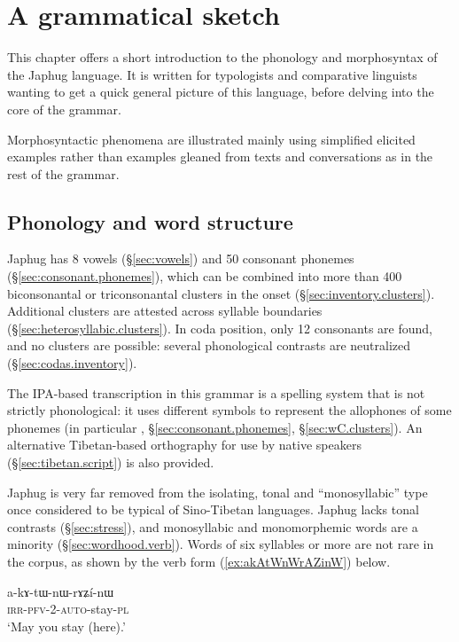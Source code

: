 \chapter{A grammatical sketch} \label{chap:sketch}

This chapter offers a short introduction to the phonology and morphosyntax of the Japhug language. It is written for typologists and comparative linguists wanting to get a quick general picture of this language, before delving into the core of the grammar.

Morphosyntactic phenomena are illustrated mainly using simplified elicited examples rather than examples gleaned from texts and conversations as in the rest of the grammar.

\section{Phonology and word structure} \label{sec:phono.introduction}
Japhug has 8 vowels (§\ref{sec:vowels}) and 50 consonant phonemes (§\ref{sec:consonant.phonemes}), which can be combined into more than 400 biconsonantal or triconsonantal clusters in the onset (§\ref{sec:inventory.clusters}). Additional clusters are attested across syllable boundaries (§\ref{sec:heterosyllabic.clusters}). In coda position, only 12 consonants are found, and no clusters are possible: several phonological contrasts are neutralized (§\ref{sec:codas.inventory}).

The IPA-based transcription in this grammar is a spelling system that is not strictly phonological: it uses different symbols to represent the allophones of some phonemes (in particular , §\ref{sec:consonant.phonemes}, §\ref{sec:wC.clusters}). An alternative Tibetan-based orthography for use by native speakers (§\ref{sec:tibetan.script}) is also provided.

Japhug is very far removed from the isolating, tonal and ``monosyllabic'' type once considered to be typical of Sino-Tibetan languages. Japhug lacks tonal contrasts (§\ref{sec:stress}), and monosyllabic and monomorphemic words are a minority (§\ref{sec:wordhood.verb}). Words of six syllables or more are not rare in the corpus, as shown by the verb form (\ref{ex:akAtWnWrAZinW}) below.

\begin{exe}
\ex \label{ex:akAtWnWrAZinW}
\gll a-kɤ-tɯ-nɯ-rɤʑí-nɯ \\
\textsc{irr}-\textsc{pfv}-2-\textsc{auto}-stay-\textsc{pl} \\
\glt `May you stay (here).'
\end{exe}

